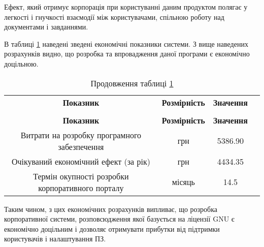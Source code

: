 \par Ефект, який отримує корпорація при користуванні даним продуктом полягає у легкості і гнучкості взаємодії між користувачами, спільною роботу над документами і завданнями.
\par В таблиці \ref{t:eco_4} наведені зведені економічні показники системи. З вище наведених розрахунків видно, що розробка та впровадження даної програми є економічно доцільною. 


{\footnotesize
\begin{longtable}{|c|c|c|c|}

\captionsetup{justification=centering}
\caption{Зведені економічні показники розробки системи}\label{t:eco_4}\\
\hline
\multicolumn{1}{|c|}{\textbf{Показник}}&
\multicolumn{1}{c|}{\textbf{Розмірність}}&
\multicolumn{1}{c|}{\textbf{Значення}}\\\hline

\endfirsthead
\caption*{\hfill Продовження таблиці \ref{t:eco_4}}\\\hline

\multicolumn{1}{|c|}{\textbf{Показник}}&
\multicolumn{1}{c|}{\textbf{Розмірність}}&
\multicolumn{1}{c|}{\textbf{Значення}}\\\hline
\endhead

Витрати на розробку програмного забезпечення & грн & 5386.90 \\ \hline
Очікуваний економічний ефект (за рік) & грн & 4434.35 \\ \hline
Термін окупності розробки корпоративного порталу & місяць & 14.5 \\ \hline

\end{longtable}
}

\par Таким чином, з цих економічних розрахунків випливає, що розробка корпоративної системи, розповсюдження якої базується на ліцензії GNU є економічно доцільним і дозволяє отримувати прибутки від підтримки користувачів і налаштування ПЗ.